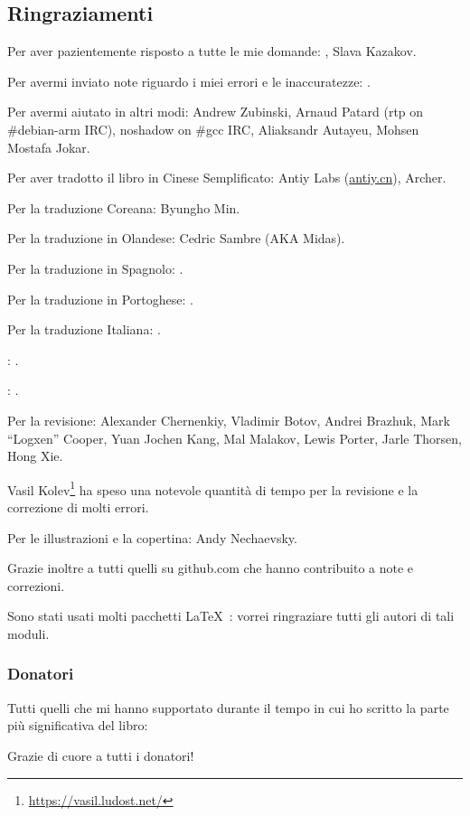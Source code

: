 \subsection*{Ringraziamenti}

Per aver pazientemente risposto a tutte le mie domande: \HERMIT, Slava  Kazakov.

Per avermi inviato note riguardo i miei errori e le inaccuratezze: \PeopleMistakesInaccuracies{}.

Per avermi aiutato in altri modi:
Andrew Zubinski,
Arnaud Patard (rtp on \#debian-arm IRC),
noshadow on \#gcc IRC,
Aliaksandr Autayeu,
Mohsen Mostafa Jokar.

Per aver tradotto il libro in Cinese Semplificato:
Antiy Labs (\href{http://antiy.cn}{antiy.cn}), Archer.

Per la traduzione Coreana: Byungho Min.

Per la traduzione in Olandese: Cedric Sambre (AKA Midas).

Per la traduzione in Spagnolo: \PeopleSpanishTranslators{}.

Per la traduzione in Portoghese: \PeoplePTBRTranslators{}.

Per la traduzione Italiana: \PeopleItalianTranslators{}.

\ITAph{}: \PeopleFrenchTranslators{}.

\ITAph{}: \PeopleGermanTranslators{}.

Per la revisione:
Alexander  Chernenkiy,
Vladimir Botov,
Andrei Brazhuk,
Mark ``Logxen'' Cooper, Yuan Jochen Kang, Mal Malakov, Lewis Porter, Jarle Thorsen, Hong Xie.

Vasil Kolev\footnote{\url{https://vasil.ludost.net/}} ha speso una notevole quantità di tempo per la revisione e la correzione di molti errori.

Per le illustrazioni e la copertina: Andy Nechaevsky.

Grazie inoltre a tutti quelli su github.com che hanno contribuito a note e correzioni\FNGithubContributors{}.

Sono stati usati molti pacchetti \LaTeX\ : vorrei ringraziare tutti gli autori di tali moduli.

\subsubsection*{Donatori}

Tutti quelli che mi hanno supportato durante il tempo in cui ho scritto la parte più significativa del libro:



Grazie di cuore a tutti i donatori!
